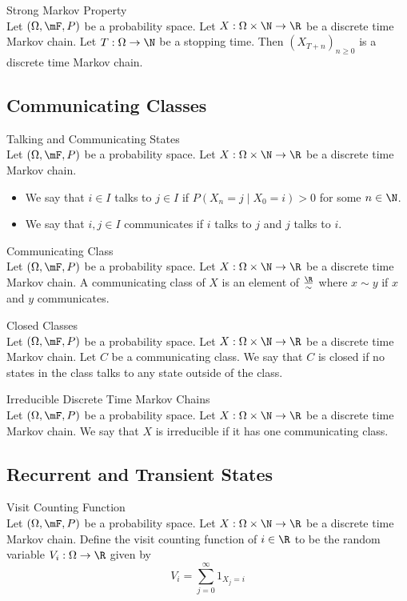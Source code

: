 \documentclass[a4paper]{article}
\begin{document}
\begin{thm}{Strong Markov Property}{}\\
Let $(\Omega,\mF,P)$ be a probability space. Let $X:\Omega\times\N\to\R$ be a discrete time Markov chain. Let $T:\Omega\to\N$ be a stopping time. Then $(X_{T+n})_{n\geq 0}$ is a discrete time Markov chain. 
\end{thm}

\subsection{Communicating Classes}
\begin{defn}{Talking and Communicating States}{}\\
Let $(\Omega,\mF,P)$ be a probability space. Let $X:\Omega\times\N\to\R$ be a discrete time Markov chain. 
\begin{itemize}
\item We say that $i\in I$ talks to $j\in I$ if $P(X_n=j\;|\;X_0=i)>0$ for some $n\in\N$. 
\item We say that $i,j\in I$ communicates if $i$ talks to $j$ and $j$ talks to $i$. 
\end{itemize}
\end{defn}

\begin{defn}{Communicating Class}{}\\
Let $(\Omega,\mF,P)$ be a probability space. Let $X:\Omega\times\N\to\R$ be a discrete time Markov chain. A communicating class of $X$ is an element of $\frac{\R}{\sim}$ where $x\sim y$ if $x$ and $y$ communicates. 
\end{defn}

\begin{defn}{Closed Classes}{}\\
Let $(\Omega,\mF,P)$ be a probability space. Let $X:\Omega\times\N\to\R$ be a discrete time Markov chain. Let $C$ be a communicating class. We say that $C$ is closed if no states in the class talks to any state outside of the class. 
\end{defn}

\begin{defn}{Irreducible Discrete Time Markov Chains}{}\\
Let $(\Omega,\mF,P)$ be a probability space. Let $X:\Omega\times\N\to\R$ be a discrete time Markov chain. We say that $X$ is irreducible if it has one communicating class. 
\end{defn}

\subsection{Recurrent and Transient States}
\begin{defn}{Visit Counting Function}{}\\
Let $(\Omega,\mF,P)$ be a probability space. Let $X:\Omega\times\N\to\R$ be a discrete time Markov chain. Define the visit counting function of $i\in\R$ to be the random variable $V_i:\Omega\to\R$ given by $$V_i=\sum_{j=0}^\infty 1_{X_j=i}$$
\end{defn}
\end{document}
